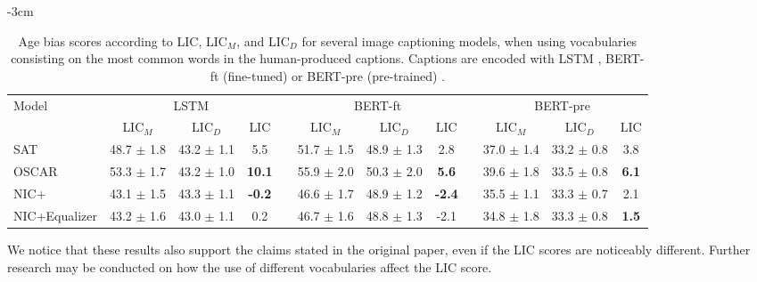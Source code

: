 \begin{table}[hbt]
\footnotesize
\centering
\addtolength{\leftskip} {-3cm}
\addtolength{\rightskip}{-3cm}

\begingroup
\setlength{\tabcolsep}{3pt} %
\renewcommand{\arraystretch}{1.2} %

\begin{tabular}{lccccccccccc}
\hline
\multirow{2}{*}{Model} & \multicolumn{3}{c}{LSTM} & & \multicolumn{3}{c}{BERT-ft} & & \multicolumn{3}{c}{BERT-pre} \\ \cline{2-4} \cline{6-8} \cline{10-12} 
                               & LIC$_M$        & LIC$_D$ & LIC & & LIC$_M$  & LIC$_D$  & LIC & & LIC$_M$  & LIC$_D$  & LIC  \\ \hline
SAT \cite{SAT}                 & 48.7 $\pm$ 1.8 & 43.2 $\pm$ 1.1 & 5.5 & & 51.7 $\pm$ 1.5 & 48.9 $\pm$ 1.3 & 2.8 & & 37.0 $\pm$ 1.4 & 33.2 $\pm$ 0.8 & 3.8 \\
OSCAR  \cite{OSCAR}            & 53.3 $\pm$ 1.7 & 43.2 $\pm$ 1.0 & \textbf{\color{red}10.1} & & 55.9 $\pm$ 2.0 & 50.3 $\pm$ 2.0 & \textbf{\color{red}5.6} & & 39.6 $\pm$ 1.8 & 33.5 $\pm$ 0.8 & \textbf{\color{red}6.1} \\
NIC+ \cite{Burns2018}          & 43.1 $\pm$ 1.5 & 43.3 $\pm$ 1.1 & \textbf{\color{green}-0.2} & & 46.6 $\pm$ 1.7 & 48.9 $\pm$ 1.2 & \textbf{\color{green}-2.4} & & 35.5 $\pm$ 1.1 & 33.3 $\pm$ 0.7 & 2.1 \\
NIC+Equalizer \cite{Burns2018} & 43.2 $\pm$ 1.6 & 43.0 $\pm$ 1.1 & 0.2 & & 46.7 $\pm$ 1.6 & 48.8 $\pm$ 1.3 & -2.1 & & 34.8 $\pm$ 1.8 & 33.3 $\pm$ 0.8 & \textbf{\color{green}1.5} \\ \hline
\end{tabular}
\caption{Age bias scores according to LIC, LIC$_M$, and LIC$_D$ for several image captioning models, when using vocabularies consisting on the most common words in the human-produced captions. Captions are encoded with LSTM \cite{LSTM}, BERT-ft (fine-tuned) or BERT-pre (pre-trained) \cite{BERT}.}
\label{table:age-vocab}
\endgroup
\end{table}

We notice that these results also support the claims stated in the original paper, even if the LIC scores are noticeably different. Further research may be conducted on how the use of different vocabularies affect the LIC score.